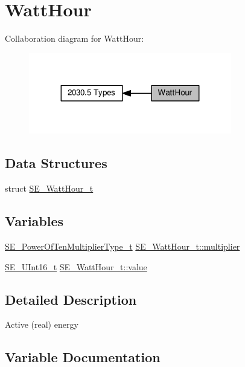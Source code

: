 \hypertarget{group__WattHour}{}\section{Watt\+Hour}
\label{group__WattHour}
Collaboration diagram for Watt\+Hour\+:\nopagebreak
\begin{figure}[H]
\begin{center}
\leavevmode
\includegraphics[width=251pt]{group__WattHour}
\end{center}
\end{figure}
\subsection*{Data Structures}
\begin{DoxyCompactItemize}
\item 
struct \hyperlink{structSE__WattHour__t}{S\+E\+\_\+\+Watt\+Hour\+\_\+t}
\end{DoxyCompactItemize}
\subsection*{Variables}
\begin{DoxyCompactItemize}
\item 
\hyperlink{group__PowerOfTenMultiplierType_gaf0317b781dc8dbb9cb6ac4e44a14fdef}{S\+E\+\_\+\+Power\+Of\+Ten\+Multiplier\+Type\+\_\+t} \hyperlink{group__WattHour_gaedaddf97e4c507ae1b711f37393869cc}{S\+E\+\_\+\+Watt\+Hour\+\_\+t\+::multiplier}
\item 
\hyperlink{group__UInt16_gac68d541f189538bfd30cfaa712d20d29}{S\+E\+\_\+\+U\+Int16\+\_\+t} \hyperlink{group__WattHour_gac2cce5b2817c07af0f2b8a8de573d845}{S\+E\+\_\+\+Watt\+Hour\+\_\+t\+::value}
\end{DoxyCompactItemize}


\subsection{Detailed Description}
Active (real) energy 

\subsection{Variable Documentation}
\mbox{\label{group__WattHour_gaedaddf97e4c507ae1b711f37393869cc}} 
